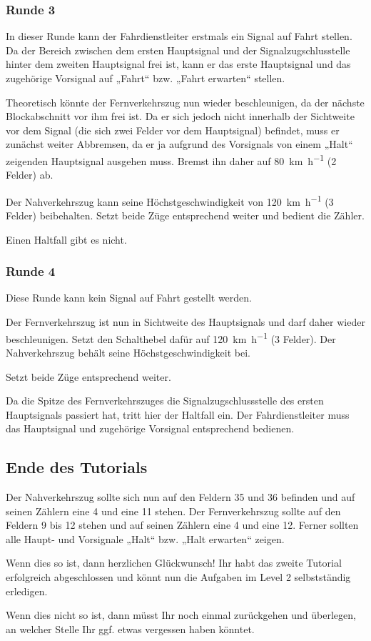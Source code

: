 \subsubsection*{Runde 3}
   In dieser Runde kann der Fahrdienstleiter erstmals ein Signal auf Fahrt stellen. Da der Bereich zwischen dem ersten Hauptsignal und der Signalzugschlusstelle hinter dem zweiten Hauptsignal frei ist, kann er das erste Hauptsignal und das zugehörige Vorsignal auf „Fahrt“ bzw. „Fahrt erwarten“ stellen.

   Theoretisch könnte der Fernverkehrszug nun wieder beschleunigen, da der nächste Blockabschnitt vor ihm frei ist. Da er sich jedoch nicht innerhalb der Sichtweite vor dem Signal (die sich zwei Felder vor dem Hauptsignal) befindet, muss er zunächst weiter Abbremsen, da er ja aufgrund des Vorsignals von einem „Halt“ zeigenden Hauptsignal ausgehen muss. Bremst ihn daher auf \SI{80}{\kilo\metre\per\hour} (2 Felder) ab.

   Der Nahverkehrszug kann seine Höchstgeschwindigkeit von \SI{120}{\kilo\metre\per\hour} (3 Felder) beibehalten. Setzt beide Züge entsprechend weiter und bedient die Zähler.

   Einen Haltfall gibt es nicht.


\subsubsection*{Runde 4}
   Diese Runde kann kein Signal auf Fahrt gestellt werden.

   Der Fernverkehrszug ist nun in Sichtweite des Hauptsignals und darf daher wieder beschleunigen. Setzt den Schalthebel dafür auf \SI{120}{\kilo\metre\per\hour} (3 Felder). Der Nahverkehrszug behält seine Höchstgeschwindigkeit bei.

   Setzt beide Züge entsprechend weiter.

   Da die Spitze des Fernverkehrszuges die Signalzugschlussstelle des ersten Hauptsignals passiert hat, tritt hier der Haltfall ein. Der Fahrdienstleiter muss das Hauptsignal und zugehörige Vorsignal entsprechend bedienen.


\subsection*{Ende des Tutorials}
  Der Nahverkehrszug sollte sich nun auf den Feldern 35 und 36 befinden und auf seinen Zählern eine 4 und eine 11 stehen. Der Fernverkehrszug sollte auf den Feldern 9 bis 12 stehen und auf seinen Zählern eine 4 und eine 12. Ferner sollten alle Haupt- und Vorsignale „Halt“ bzw. „Halt erwarten“ zeigen.
  \begin{framed}\noindent
    Wenn dies so ist, dann herzlichen Glückwunsch! Ihr habt das zweite Tutorial erfolgreich abgeschlossen und könnt nun die Aufgaben im Level 2 selbstständig erledigen.
  \end{framed}
  \begin{framed}\noindent
    Wenn dies nicht so ist, dann müsst Ihr noch einmal zurückgehen und überlegen, an welcher Stelle Ihr ggf. etwas vergessen haben könntet.
  \end{framed}
